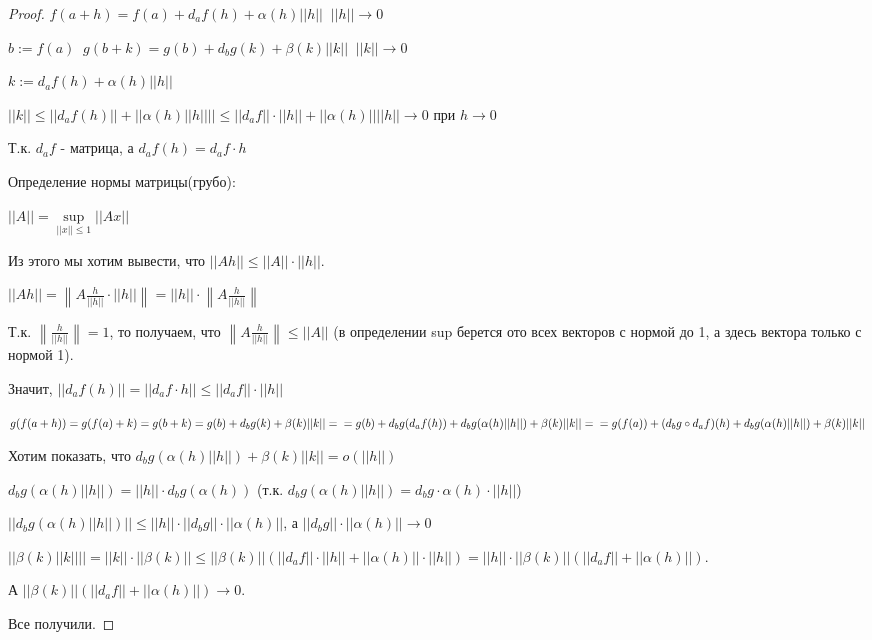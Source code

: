 \begin{proof}\slashns
    
    $f(a+h) = f(a) + d_a f(h) + \alpha(h) ||h|| \;\; ||h|| \to 0$
    
    $b:= f(a) \;\; g(b+k) = g(b) + d_b g(k) + \beta(k) ||k|| \;\; ||k|| \to 0$
    
    $k:= d_a f(h) + \alpha(h) ||h||$
    
    $||k|| \le ||d_a f(h)|| + ||\alpha(h) ||h|| || \le ||d_a f|| \cdot ||h|| + ||\alpha(h)|| ||h|| \to 0$ при $h \to 0$

    \begin{remark} \thmslashn

        Т.к. $d_a f$ - матрица, а $d_a f(h) = d_a f \cdot h$

        Определение нормы матрицы(грубо):

        $||A|| = \sup\limits_{||x|| \le 1} ||A x||$

        Из этого мы хотим вывести, что $||A h|| \le ||A|| \cdot ||h||$.

        $||A h|| = \left\lVert A \frac{h}{||h||} \cdot ||h|| \right\rVert = ||h|| \cdot \left\lVert A \frac{h}{||h||} \right\rVert$

        Т.к. $\left\lVert \frac{h}{||h||} \right\rVert = 1$, то получаем, что $\left\lVert A \frac{h}{||h||} \right\rVert \le ||A||$ (в определении sup берется ото всех векторов с нормой до 1, а здесь вектора только с нормой 1).

        Значит, $||d_a f(h)|| = ||d_a f \cdot h|| \le ||d_a f|| \cdot ||h||$

    \end{remark}
    
    $g(f(a+h)) = g(f(a) + k) = g(b + k) = g(b) + d_b g(k) + \beta(k) ||k|| =\\= g(b) + d_b g(d_a f(h)) + d_b g(\alpha(h) ||h||)+ \beta(k) ||k|| =\\= g(f(a)) + (d_b g \circ d_a f)(h) + d_b g(\alpha(h) ||h||) + \beta(k) ||k||$
    
    Хотим показать, что $d_b g(\alpha(h) ||h||) + \beta(k) ||k|| = o(||h||)$
    
    $d_b g(\alpha(h) ||h||) = ||h|| \cdot d_b g(\alpha(h))$ (т.к. $d_b g(\alpha(h) ||h||) = d_b g \cdot \alpha(h) \cdot ||h||$)
    
    $||d_b g(\alpha(h) ||h||)|| \le ||h|| \cdot ||d_b g|| \cdot ||\alpha(h)||$, а $||d_b g|| \cdot ||\alpha(h)|| \to 0$
    
    
    $||\beta(k) ||k|| || = ||k|| \cdot ||\beta(k)|| \le ||\beta(k)|| (||d_a f|| \cdot ||h|| + ||\alpha(h)|| \cdot ||h||) = ||h|| \cdot ||\beta(k)||(||d_a f|| + ||\alpha(h)||)$. 
    
    
    А $||\beta(k)||(||d_a f|| + ||\alpha(h)||) \to 0$.
    
    Все получили.
\end{proof}
